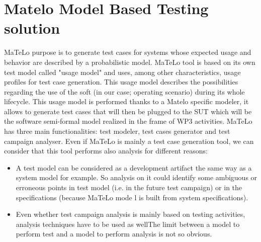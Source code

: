 \section{Matelo Model Based Testing solution}
MaTeLo purpose is to generate test cases for systems whose expected
usage and behavior are described by a probabilistic model. MaTeLo tool
is based on its own test model called "usage model" and uses, among
other characteristics, usage profiles for test case generation. This
usage model describes the possibilities regarding the use of the soft
(in our case; operating scenario) during its whole lifecycle. This
usage model is performed thanks to a Matelo specific modeler, it
allows to generate test cases that will then be plugged to the SUT
which will be the software semi-formal model realized in the frame of
WP3 activities.  MaTeLo has three main functionalities: test modeler,
test cases generator and test campaign analyser. Even if MaTeLo is
mainly a test case generation tool, we can consider that this tool
performs also analysis for different reasons:
\begin{itemize}
\item A test model can be considered as a development artifact the
  same way as a system model for example. So analysis on it could
  identify some ambiguous or erroneous points in test model (i.e. in
  the future test campaign) or in the specifications (because MaTeLo
  mode l is built from system specifications).
\item Even whether test campaign analysis is mainly based on testing
  activities, analysis techniques have to be used as wellThe limit
  between a model to perform test and a model to perform analysis is
  not so obvious.
\end{itemize}

